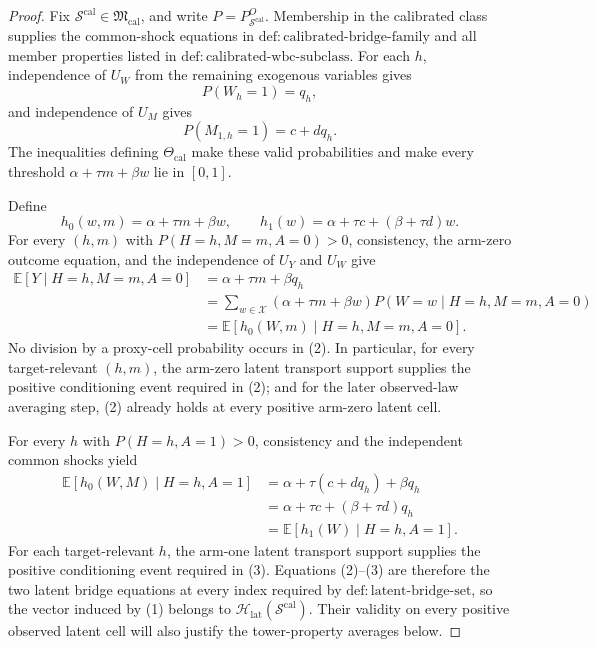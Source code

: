 \documentclass{article}
\begin{document}
\begin{proof}
Fix \(\mathcal S^{\mathrm{cal}}\in\mathfrak M_{\mathrm{cal}}\), and write
\(P=P_{\mathcal S^{\mathrm{cal}}}^O\).  Membership in the calibrated class supplies
the common-shock equations in \(\mathrm{def{:}calibrated\text{-}bridge\text{-}family}\)
and all member properties listed in \(\mathrm{def{:}calibrated\text{-}wbc\text{-}subclass}\).
For each \(h\), independence of \(U_W\) from the remaining exogenous variables gives
\[
 P(W_h=1)=q_h,
\]
and independence of \(U_M\) gives
\[
 P(M_{1,h}=1)=c+dq_h.
\]
The inequalities defining \(\Theta_{\mathrm{cal}}\) make these valid probabilities
and make every threshold \(\alpha+\tau m+\beta w\) lie in \([0,1]\).

Define
\[
 h_0(w,m)=\alpha+\tau m+\beta w,
 \qquad
 h_1(w)=\alpha+\tau c+(\beta+\tau d)w.
 \tag{1}
\]
For every \((h,m)\) with \(P(H=h,M=m,A=0)>0\), consistency, the arm-zero
outcome equation, and the independence of \(U_Y\) and \(U_W\) give
\[
 \begin{aligned}
 \mathbb E[Y\mid H=h,M=m,A=0]
 &=\alpha+\tau m+\beta q_h\\
 &=\sum_{w\in\mathcal X}(\alpha+\tau m+\beta w)
          P(W=w\mid H=h,M=m,A=0)\\
 &=\mathbb E[h_0(W,m)\mid H=h,M=m,A=0].
 \end{aligned}
 \tag{2}
\]
No division by a proxy-cell probability occurs in (2).  In particular, for every
target-relevant \((h,m)\), the arm-zero latent transport support supplies the positive
conditioning event required in (2); and for the later observed-law averaging step,
(2) already holds at every positive arm-zero latent cell.

For every \(h\) with \(P(H=h,A=1)>0\), consistency and the independent common
shocks yield
\[
 \begin{aligned}
 \mathbb E[h_0(W,M)\mid H=h,A=1]
 &=\alpha+\tau(c+dq_h)+\beta q_h\\
 &=\alpha+\tau c+(\beta+\tau d)q_h\\
 &=\mathbb E[h_1(W)\mid H=h,A=1].
 \end{aligned}
 \tag{3}
\]
For each target-relevant \(h\), the arm-one latent transport support supplies the
positive conditioning event required in (3).  Equations (2)--(3) are therefore the
two latent bridge equations at every index required by
\(\mathrm{def{:}latent\text{-}bridge\text{-}set}\), so the vector induced by (1)
belongs to \(\mathcal H_{\mathrm{lat}}(\mathcal S^{\mathrm{cal}})\).  Their validity
on every positive observed latent cell will also justify the tower-property averages
below.


\end{proof}
\end{document}
